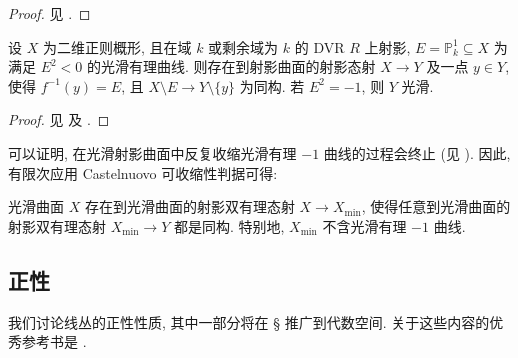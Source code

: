 \begin{proof}
见 \cite[定理 $2.12$]{Kol07}.
\end{proof}
\begin{theorem}\label{src:B.2.6}
设 $X$ 为二维正则概形, 且在域 $k$ 或剩余域为 $k$ 的 DVR $R$ 上射影, $E=\mathbb P^1_k\subseteq X$ 为满足 $E^2<0$ 的光滑有理曲线. 则存在到射影曲面的射影态射 $X\to Y$ 及一点 $y\in Y$, 使得 $f^{-1}(y)=E$, 且 $X\setminus E\to Y\setminus\{y\}$ 为同构. 若 $E^2=-1$, 则 $Y$ 光滑.
\end{theorem}
\begin{proof}
见 \cite[定理 V.$5.7$, 习题 V.$5.2$]{Har77} 及 \cite[定理 $2.14$, 注记 $2.15$]{Kol07}.
\end{proof}
可以证明, 在光滑射影曲面中反复收缩光滑有理 $-1$ 曲线的过程会终止 (见 \cite[定理 $5.8$]{Har77}). 因此, 有限次应用 Castelnuovo 可收缩性判据可得:
\begin{corollary}[极小模型的存在性]\label{src:B.2.7}
光滑曲面 $X$ 存在到光滑曲面的射影双有理态射 $X\to X_{\min}$, 使得任意到光滑曲面的射影双有理态射 $X_{\min}\to Y$ 都是同构. 特别地, $X_{\min}$ 不含光滑有理 $-1$ 曲线.
\end{corollary}

\subsection{正性}\label{src:B.2.2-subsection}
我们讨论线丛的正性性质, 其中一部分将在 \S{} 推广到代数空间. 关于这些内容的优秀参考书是 \cite{Laz04a,Laz04b}.

